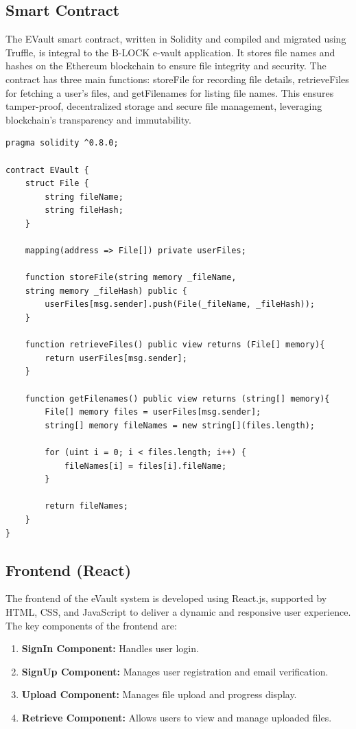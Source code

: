 \documentclass[12pt,a4paper]{report}
\begin{document}
\subsection{Smart Contract}
The EVault smart contract\cite{antonopoulos2018mastering}, written in Solidity and compiled and migrated using Truffle\cite{truffledocs}, is integral to the B-LOCK e-vault application. It stores file names and hashes on the Ethereum blockchain to ensure file integrity and security. The contract has three main functions: storeFile for recording file details, retrieveFiles for fetching a user's files, and getFilenames for listing file names. This ensures tamper-proof, decentralized storage and secure file management, leveraging blockchain's transparency and immutability.
\begin{lstlisting}[caption=Solidity Smart Contract (EVault.sol)]
    pragma solidity ^0.8.0;

contract EVault {
    struct File {
        string fileName;
        string fileHash;
    }

    mapping(address => File[]) private userFiles;

    function storeFile(string memory _fileName, 
    string memory _fileHash) public {
        userFiles[msg.sender].push(File(_fileName, _fileHash));
    }

    function retrieveFiles() public view returns (File[] memory){
        return userFiles[msg.sender];
    }
    
    function getFilenames() public view returns (string[] memory){
        File[] memory files = userFiles[msg.sender];
        string[] memory fileNames = new string[](files.length);

        for (uint i = 0; i < files.length; i++) {
            fileNames[i] = files[i].fileName;
        }

        return fileNames;
    }
}
    \end{lstlisting}
\subsection{Frontend (React)}
\par
The frontend of the eVault system is developed using React.js, supported by HTML, CSS, and JavaScript to deliver a dynamic and responsive user experience. The key components of the frontend are:
\begin{enumerate}
   \item \textbf{SignIn Component:} Handles user login.
   \item \textbf{SignUp Component:} Manages user registration and email verification.
   \item \textbf{Upload Component:} Manages file upload and progress display.
   \item \textbf{Retrieve Component:} Allows users to view and manage uploaded files.
\end{enumerate}
   
\end{document}
